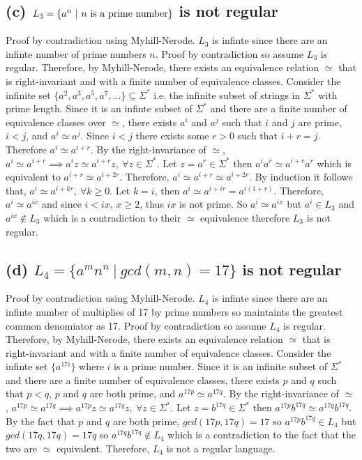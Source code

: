 \documentclass[12pt]{article}
\begin{document}
\subsection*{(c) $L_3 = \{a^n\ |\ n \textnormal{ is a prime number}\}$
\textnormal{is} not \textnormal{regular}}
Proof by contradiction using Myhill-Nerode. $L_3$ is infinte since there are
an infinte number of prime numbers $n$. Proof by contradiction so assume $L_3$
is regular. Therefore, by Myhill-Nerode, there exists an equivalence relation
$\simeq$ that is right-invariant and with a finite number of equivalence
classes. Consider the infinite set $\{a^2, a^3, a^5, a^7, ...\} \subseteq
\Sigma^*$ i.e. the infinite subset of strings in $\Sigma^*$ with prime length.
Since it is an infinte subset of $\Sigma^*$ and there are a finite number of
equivalence classes over $\simeq$, there exists $a^i$ and $a^j$ such that $i$
and $j$ are prime, $i < j$, and $a^i \simeq a^j$. Since $i < j$ there exists
some $r > 0$ such that $i + r  = j$. Therefore $a^i \simeq a^{i+r}$.
By the right-invariance of
$\simeq$, $a^i \simeq a^{i+r} \implies a^{i}z \simeq a^{i+r}z,
\ \forall z \in \Sigma^*$. Let $z = a^r \in \Sigma^*$ then
$a^{i}a^{r} \simeq a^{i+r}a^{r}$ which is equivalent to
$a^{i+r} \simeq a^{i+2r}$. Therefore, $a^i \simeq a^{i+r} \simeq a^{i+2r}$.
By induction it follows that, $a^i \simeq a^{i + kr},\ \forall k \ge 0$.
Let $k = i$, then $a^i \simeq a^{i+ir} = a^{i(1+r)}$. Therefore,
$a^i \simeq a^{ix}$ and since $i < ix$, $x \ge 2$, thus $ix$ is not prime. So
$a^i \simeq a^{ix}$ but $a^i \in L_3$ and $a^{ix} \notin L_3$ which is a
contradiction to their $\simeq$ equivalence therefore $L_3$ is not regular.

\subsection*{(d) $L_4 = \{a^{m}n^{n}\ |\ gcd(m,n) = 17\}$
\textnormal{is} not \textnormal{regular}}
Proof by contradiction using Myhill-Nerode. $L_4$ is infinte since there are
an infinte number of multiplies of 17 by prime numbers so maintaints the
greatest common denomiator as 17. Proof by contradiction so assume $L_4$ is
regular. Therefore, by Myhill-Nerode, there exists an equivalence relation
$\simeq$ that is right-invariant and with a finite number of equivalence
classes. Consider the infinte set $\{a^{17i}\}$ where $i$ is a
prime number. Since it is an infinite subset of $\Sigma^*$ and there are a
finite number of equivalence classes, there exists $p$ and $q$ such that
$p < q$, $p$ and $q$ are both prime, and $a^{17p} \simeq a^{17q}$. By the
right-invariance of $\simeq$, $a^{17p} \simeq a^{17q} \implies
a^{17p}z \simeq a^{17q}z,\ \forall z \in \Sigma^*$.
Let $z = b^{17q} \in \Sigma^*$ then $a^{17p}b^{17q} \simeq a^{17q}b^{17q}$.
By the fact that $p$ and $q$ are both prime, $gcd(17p, 17q) = 17$ so
$a^{17p}b^{17q} \in L_4$ but $gcd(17q, 17q) = 17q$ so
$a^{17q}b^{17q} \notin L_4$ which is a contradiction to the fact that the two
are $\simeq$ equivalent. Therefore, $L_4$ is not a regular language.
\end{document}
